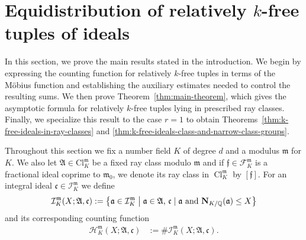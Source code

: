 \documentclass[11pt, reqno]{amsart}
\numberwithin{equation}{section}
\newcommand{\suchthat}{\;\ifnum\currentgrouptype=16 \middle\fi|\;}
\newcommand{\Q}{\mathbb{Q}}
\newcommand{\Cl}{\operatorname{Cl}}
\newcommand{\Nrm}[2]{\mathbf{N}_{#1}(#2)}
\theoremstyle{definition}
\begin{document}
\section{\texorpdfstring{Equidistribution of relatively $k$-free tuples of ideals}{Equidistribution of relatively k-free tuples of ideals}} 

In this section, we prove the main results stated in the introduction.
We begin by expressing the counting function for relatively $k$-free tuples in terms of the M\"obius function and establishing the auxiliary
estimates needed to control the resulting sums. We then prove
Theorem~\ref{thm:main-theorem}, which gives the asymptotic formula for relatively $k$-free tuples lying in prescribed ray classes. Finally,
we specialize this result to the case $r=1$ to obtain
Theorems~\ref{thm:k-free-ideals-in-ray-classes} and
\ref{thm:k-free-ideals-class-and-narrow-class-groups}.



Throughout this section we fix a number field $K$ of degree $d$ and a modulus $\mathfrak{m}$ for $K$.
We also let $\mathfrak{A} \in \mathrm{Cl}_K^{\mathfrak{m}}$ be a fixed ray class modulo $\mathfrak{m}$ and if $\mathfrak{f} \in \mathcal{F}_K^{\mathfrak{m}}$ is a fractional ideal coprime to $\mathfrak{m}_0$, we denote its ray class in $\Cl_K^{\mathfrak{m}}$ by $[\mathfrak{f}]$.
For an integral ideal $\mathfrak{c} \in \mathcal{I}_K^{\mathfrak{m}}$ we define
\begin{align}\label{eqn:ideals-divisible-by-c}
\mathcal{I}_K^{\mathfrak{m}}(X; \mathfrak{A}, \mathfrak{c}) := \left\{ \mathfrak{a} \in \mathcal{I}_K^{\mathfrak{m}} \suchthat \text{$\mathfrak{a} \in \mathfrak{A}$,  $\mathfrak{c} \mid \mathfrak{a}$  and $\Nrm{K/\Q}{\mathfrak{a}} \leq X$} \right\}
\end{align}
and its corresponding counting function
\begin{align*}
\mathcal{H}_K^{\mathfrak{m}}(X; \mathfrak{A}, \mathfrak{c}) &:= \# \mathcal{I}_K^{\mathfrak{m}}(X; \mathfrak{A}, \mathfrak{c}).
\end{align*}
\end{document}
